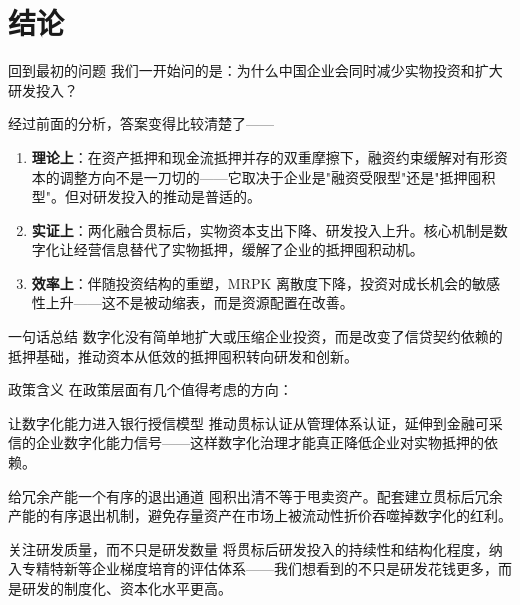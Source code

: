 \section{结论}

\begin{frame}{回到最初的问题}
  我们一开始问的是：为什么中国企业会同时减少实物投资和扩大研发投入？

  \vspace{0.5em}
  经过前面的分析，答案变得比较清楚了——

  \vspace{0.3em}
  \begin{enumerate}
    \item \textbf{理论上}：在资产抵押和现金流抵押并存的双重摩擦下，融资约束缓解对有形资本的调整方向不是一刀切的——它取决于企业是"融资受限型"还是"抵押囤积型"。但对研发投入的推动是普适的。
    \item \textbf{实证上}：两化融合贯标后，实物资本支出下降、研发投入上升。核心机制是数字化让经营信息替代了实物抵押，缓解了企业的抵押囤积动机。
    \item \textbf{效率上}：伴随投资结构的重塑，MRPK 离散度下降，投资对成长机会的敏感性上升——这不是被动缩表，而是资源配置在改善。
  \end{enumerate}

  \begin{findingbox}{一句话总结}
    数字化没有简单地扩大或压缩企业投资，而是改变了信贷契约依赖的抵押基础，推动资本从低效的抵押囤积转向研发和创新。
  \end{findingbox}
\end{frame}

\begin{frame}{政策含义}
  在政策层面有几个值得考虑的方向：

  \vspace{0.5em}
  \scriptsize
  \begin{policybox}{让数字化能力进入银行授信模型}
    推动贯标认证从管理体系认证，延伸到金融可采信的企业数字化能力信号——这样数字化治理才能真正降低企业对实物抵押的依赖。
  \end{policybox}

  \vspace{0.3em}
  \begin{policybox}{给冗余产能一个有序的退出通道}
    囤积出清不等于甩卖资产。配套建立贯标后冗余产能的有序退出机制，避免存量资产在市场上被流动性折价吞噬掉数字化的红利。
  \end{policybox}

  \vspace{0.3em}
  \begin{policybox}{关注研发质量，而不只是研发数量}
    将贯标后研发投入的持续性和结构化程度，纳入专精特新等企业梯度培育的评估体系——我们想看到的不只是研发花钱更多，而是研发的制度化、资本化水平更高。
  \end{policybox}
\end{frame}
